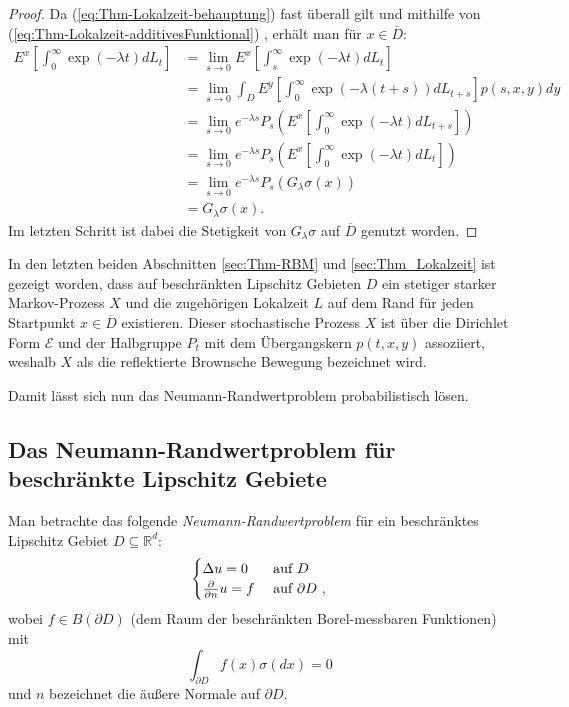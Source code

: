 \documentclass[10pt, a4paper, leqno, twoside, bibliography=totocnumbered, final]{scrartcl}
\theoremstyle{definition}
\theoremstyle{plain}%
\theoremstyle{remark}
\begin{document}
\begin{proof}
Da (\ref{eq:Thm-Lokalzeit-behauptung}) fast überall gilt und mithilfe von (\ref{eq:Thm-Lokalzeit-additivesFunktional}) , erhält man für $ x \in \overline{D} $:
\begin{align*}
E^x \left[ \int_0^{\infty} \exp(-\lambda t) dL_t  \right] & = \lim_{s \to 0} E^x \left[ \int_s^{\infty} \exp(-\lambda t) dL_t  \right] \\
& = \lim_{s \to 0} \int_D E^y \left[ \int_0^{\infty} \exp(-\lambda (t+s)) dL_{t+s}  \right] p(s,x,y) dy \\
& = \lim_{s \to 0} e^{-\lambda s} P_s \left( E^x \left[ \int_0^{\infty} \exp(-\lambda t) dL_{t+s}  \right]  \right) \\
& = \lim_{s \to 0} e^{-\lambda s} P_s \left( E^x \left[ \int_0^{\infty} \exp(-\lambda t) dL_t  \right]  \right) \\
& = \lim_{s \to 0} e^{-\lambda s} P_s \left( G_{\lambda} \sigma (x) \right) \\
& = G_{\lambda} \sigma (x).
\end{align*}
Im letzten Schritt ist dabei die Stetigkeit von $ G_{\lambda} \sigma $ auf $ \overline{D} $ genutzt worden.


\end{proof}


In den letzten beiden Abschnitten \ref{sec:Thm-RBM} und \ref{sec:Thm_Lokalzeit} ist gezeigt worden, dass auf beschränkten Lipschitz Gebieten $ D $ ein stetiger starker Markov-Prozess $ X $ und die zugehörigen Lokalzeit $ L $ auf dem Rand für jeden Startpunkt $ x \in \overline{D} $ existieren. Dieser stochastische Prozess $ X $ ist über die Dirichlet Form $ \mathcal{E} $ und der Halbgruppe $ P_t $ mit dem Übergangskern $ p(t,x,y) $ assoziiert, weshalb $ X $ als die reflektierte Brownsche Bewegung bezeichnet wird.

Damit lässt sich nun das Neumann-Randwertproblem probabilistisch lösen.


\subsection{Das Neumann-Randwertproblem für beschränkte Lipschitz Gebiete}
\label{sec:NRWP-section}

Man betrachte das folgende \emph{Neumann-Randwertproblem} für ein beschränktes Lipschitz Gebiet $ D \subseteq \mathbb{R}^d $:
\begin{equation}
\label{eq:NWRP-Definition}
\begin{cases}
\Delta u = 0 & \text{ auf $D$ }\\
\frac{\partial}{\partial n} u = f & \text{ auf $ \partial D $ },
\end{cases}
\end{equation}
wobei $ f \in B( \partial D ) $ (dem Raum der beschränkten Borel-messbaren Funktionen) mit
\begin{equation}
\int_{\partial D} f(x) \sigma (dx) = 0
\end{equation}
und $n$ bezeichnet die äußere Normale auf $ \partial D $.
\end{document}
